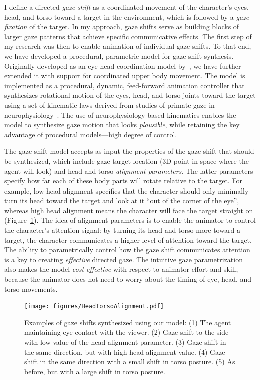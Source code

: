 I define a directed \emph{gaze shift} as a coordinated movement of the character's eyes, head, and torso toward a target in the environment, which is followed by a \emph{gaze fixation} of the target. In my approach, gaze shifts serve as building blocks of larger gaze patterns that achieve specific communicative effects. The first step of my research was then to enable animation of individual gaze shifts. To that end, we have developed a procedural, parametric model for gaze shift synthesis. Originally developed as an eye-head coordination model by~\citet{andrist2012headeye}, we have further extended it with support for coordinated upper body movement. The model is implemented as a procedural, dynamic, feed-forward animation controller that synthesizes rotational motion of the eyes, head, and torso joints toward the target using a set of kinematic laws derived from studies of primate gaze in neurophysiology~\citep{guitton1987gaze,mccluskey2007monkeys}. The use of neurophysiology-based kinematics enables the model to synthesize gaze motion that looks \emph{plausible}, while retaining the key advantage of procedural models---high degree of control.

The gaze shift model accepts as input the properties of the gaze shift that should be synthesized, which include gaze target location (3D point in space where the agent will look) and head and torso
\emph{alignment parameters}. The latter parameters specify how far each of these body parts will rotate relative to the target. For example, low head alignment specifies that the character should only minimally turn its head toward the target and look at it ``out of the corner of the eye'', whereas high head alignment means the character will face the target straight on (Figure~\ref{fig:HeadTorsoAlignment}). The idea of alignment parameters is to enable the animator to control the character's attention signal: by turning its head and torso more toward a target, the character communicates a higher level of attention toward the target. The ability to parametrically control how the gaze shift communicates attention is a key to creating \emph{effective} directed gaze. The intuitive gaze parametrization also makes the model \emph{cost-effective} with respect to animator effort and skill, because the animator does not need to worry about the timing of eye, head, and torso movements.

\begin{figure}
\centering
\texttt{[image: figures/HeadTorsoAlignment.pdf]}
\caption{Examples of gaze shifts synthesized using our model: (1) The agent maintaining eye contact with the viewer. (2) Gaze shift to the side with low value of the head alignment parameter. (3) Gaze shift in the same direction, but with high head alignment value. (4) Gaze shift in the same direction with a small shift in torso posture. (5) As before, but with a large shift in torso posture.}
\label{fig:HeadTorsoAlignment}
\end{figure}


